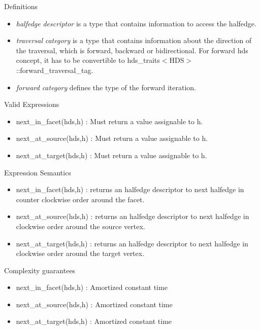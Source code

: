 \begin{Desc}
\item[Definitions]\begin{itemize}
\item {\em halfedge\/} {\em descriptor\/} is a type that contains information to access the halfedge.\item {\em traversal\/} {\em category\/} is a type that contains information about the direction of the traversal, which is forward, backward or bidirectional. For forward hds concept, it has to be convertible to hds\_\-traits$<$HDS$>$::forward\_\-traversal\_\-tag.\item {\em forward\/} {\em category\/} defines the type of the forward iteration.\end{itemize}
\end{Desc}
\begin{Desc}
\item[Valid Expressions]\begin{itemize}
\item next\_\-in\_\-facet(hds,h) : Must return a value assignable to h.\item next\_\-at\_\-source(hds,h) : Must return a value assignable to h.\item next\_\-at\_\-target(hds,h) : Must return a value assignable to h.\end{itemize}
\end{Desc}
\begin{Desc}
\item[Expression Semantics]\begin{itemize}
\item next\_\-in\_\-facet(hds,h) : returns an halfedge descriptor to next halfedge in counter clockwise order around the facet.\item next\_\-at\_\-source(hds,h) : returns an halfedge descriptor to next halfedge in clockwise order around the source vertex.\item next\_\-at\_\-target(hds,h) : returns an halfedge descriptor to next halfedge in clockwise order around the target vertex.\end{itemize}
\end{Desc}
\begin{Desc}
\item[Complexity guarantees]\begin{itemize}
\item next\_\-in\_\-facet(hds,h) : Amortized constant time\item next\_\-at\_\-source(hds,h) : Amortized constant time\item next\_\-at\_\-target(hds,h) : Amortized constant time\end{itemize}
\end{Desc}
